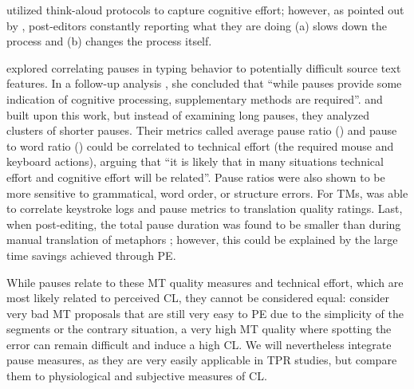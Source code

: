 \documentclass[output=paper]{langsci/langscibook}
\begin{document}
\citet{krings2001repairing} utilized think-aloud protocols to capture cognitive effort; however, as pointed out by \citet{o2005methodologies}, post-editors constantly reporting what they are doing (a) slows down the process and (b) changes the process itself.

\citet{o2005methodologies} explored correlating pauses in typing behavior to potentially difficult source text features. In a follow-up analysis \citep{o2006pauses}, she concluded that ``while pauses provide some indication of cognitive processing, supplementary methods are required''. %
\citet{lacruz2012average} and \citet{lacruz2014chapter} built upon this work, but instead of examining long pauses, they analyzed clusters of shorter pauses. Their metrics called average pause ratio (\apr{}) and pause to word ratio (\pwr{}) could be correlated to technical effort (the required mouse and keyboard actions), arguing that ``it is likely that in many situations technical effort and cognitive effort will be related''. Pause ratios were also shown to be more sensitive to grammatical, word order, or structure errors.
For TMs, \citet{mellinger2014computer} was able to correlate keystroke logs and pause metrics to translation quality ratings.
Last, when post-editing, the total pause duration was found to be smaller than during manual translation of metaphors  \citep{koglin2015empirical}; however, this could be explained by the large time savings achieved through PE.

While pauses relate to these MT quality measures and technical effort, which are most likely related to perceived CL, they cannot be considered equal: consider very bad MT proposals that are still very easy to PE due to the simplicity of the segments or the contrary situation, a very high MT quality where spotting the error can remain difficult and induce a high CL. We will nevertheless integrate pause measures, as they are very easily applicable in TPR studies, but compare them to physiological and subjective measures of CL.
\end{document}
